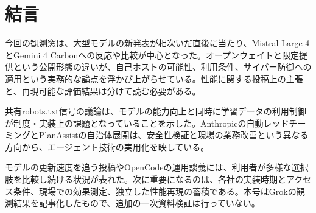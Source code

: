 \section*{結言}
今回の観測窓は、大型モデルの新発表が相次いだ直後に当たり、Mistral Large 4とGemini 4 Carbonへの反応や比較が中心となった。オープンウェイトと限定提供という公開形態の違いが、自己ホストの可能性、利用条件、サイバー防御への適用という実務的な論点を浮かび上がらせている。性能に関する投稿上の主張と、再現可能な評価結果は分けて読む必要がある。

共有robots.txt信号の議論は、モデルの能力向上と同時に学習データの利用制御が制度・実装上の課題となっていることを示した。Anthropicの自動レッドチーミングとPlanAssistの自治体展開は、安全性検証と現場の業務改善という異なる方向から、エージェント技術の実用化を映している。

モデルの更新速度を追う投稿やOpenCodeの運用談義には、利用者が多様な選択肢を比較し続ける状況が表れた。次に重要になるのは、各社の実装時期とアクセス条件、現場での効果測定、独立した性能再現の蓄積である。本号はGrokの観測結果を記事化したもので、追加の一次資料検証は行っていない。
